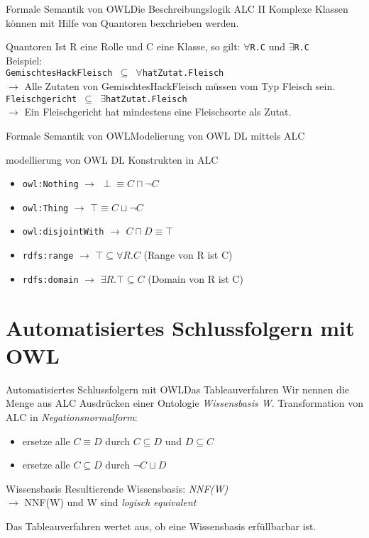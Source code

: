 \documentclass{beamer}
\begin{document}
\begin{frame}{Formale Semantik von OWL}{Die Beschreibungslogik ALC II}
Komplexe Klassen können mit Hilfe von Quantoren bexchrieben werden.
\begin{block}{Quantoren}
	Ist R eine Rolle und C eine Klasse, so gilt: \texttt{$\forall $R.C} und \texttt{$ \exists $R.C}\\
	Beispiel:\\
	\texttt{GemischtesHackFleisch $ \subseteq $ $ \forall $hatZutat.Fleisch}\\
	$ \rightarrow $ Alle Zutaten von GemischtesHackFleisch müssen vom Typ Fleisch sein.
	\texttt{Fleischgericht $ \subseteq $ $ \exists $hatZutat.Fleisch}\\
	$ \rightarrow $ Ein Fleischgericht hat mindestens eine Fleischsorte als Zutat.
\end{block}
\end{frame}

\begin{frame}{Formale Semantik von OWL}{Modelierung von OWL DL mittels ALC}
\begin{block}{modellierung von OWL DL Konstrukten in ALC}
\begin{itemize}
	\item \texttt{owl:Nothing} $ \rightarrow $ $ \perp \equiv C \sqcap \neg C $
	\item \texttt{owl:Thing} $ \rightarrow $ $ \top \equiv C \sqcup \neg C $
	\item \texttt{owl:disjointWith} $\rightarrow $ $ C \sqcap D \equiv \top  $	
	\item \texttt{rdfs:range} $\rightarrow $ $ \top \subseteq \forall R.C $ (Range von R ist C)
	\item \texttt{rdfs:domain} $\rightarrow $ $ \exists R.\top \subseteq C $ (Domain von R ist C)
\end{itemize}
\end{block}
\end{frame}

\section{Automatisiertes Schlussfolgern mit OWL}
\begin{frame}{Automatisiertes Schlussfolgern mit OWL}{Das Tableauverfahren}
Wir nennen die Menge aus ALC Ausdrücken einer Ontologie \emph{Wissensbasis W}.
Transformation von ALC in \emph{Negationsnormalform}:
\begin{itemize}
	\item ersetze alle $ C \equiv D $ durch $ C \subseteq D $ und $ D \subseteq C $
	\item ersetze alle $ C \subseteq D $ durch $ \neg C \sqcup D $
\end{itemize}
\begin{block}{Wissensbasis}
	Resultierende Wissensbasis: \emph{NNF(W)}\\
	$ \rightarrow $ NNF(W) und W sind \emph{logisch equivalent}
\end{block}
Das Tableauverfahren wertet aus, ob eine Wissensbasis erfüllbarbar ist. 
\end{frame}
\end{document}
